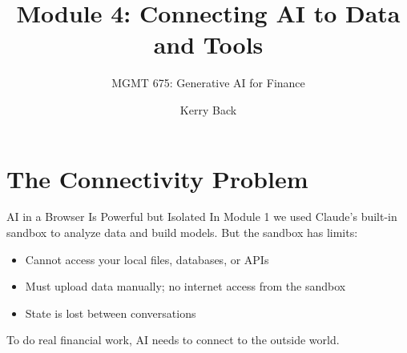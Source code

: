 \documentclass[aspectratio=169]{beamer}
\subtitle{MGMT 675: Generative AI for Finance}
\title{Module 4: Connecting AI to Data and Tools}
\author{Kerry Back}
\date{}
\begin{document}
\maketitle

\section{The Connectivity Problem}

\begin{frame}{AI in a Browser Is Powerful but Isolated}
In Module 1 we used Claude's built-in sandbox to analyze data and build models. But the sandbox has limits:
\vspace{0.3cm}
\begin{itemize}
  \item Cannot access your local files, databases, or APIs
  \item Must upload data manually; no internet access from the sandbox
  \item State is lost between conversations
\end{itemize}
\vspace{0.3cm}
\alert{To do real financial work, AI needs to connect to the outside world.}
\end{frame}
\end{document}
